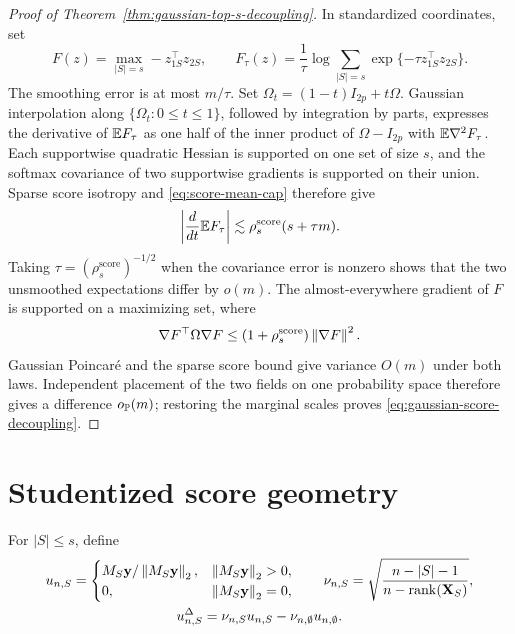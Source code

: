 \begin{proof}[Proof of
Theorem~\ref{thm:gaussian-top-s-decoupling}]
In standardized coordinates, set
\[
 F(z)=\max_{|S|=s}-z_{1S}^\top z_{2S},
 \qquad
 F_\tau(z)=\frac1\tau
 \log\sum_{|S|=s}\exp\{-\tau z_{1S}^\top z_{2S}\}.
\]
The smoothing error is at most $m/\tau$.  Set
$\Omega_t=(1-t)I_{2p}+t\Omega$.  Gaussian interpolation along
$\{\Omega_t:0\le t\le1\}$, followed by integration by parts,
expresses the derivative of $\mathbb E F_\tau$ as one half of the inner product
of $\Omega-I_{2p}$ with $\mathbb E\nabla^2F_\tau$.  Each supportwise quadratic
Hessian is supported on one set of size $s$, and the softmax covariance
of two supportwise gradients is supported on their union.  Sparse score
isotropy and \eqref{eq:score-mean-cap} therefore give
\[
 \left|\frac{d}{dt}\mathbb E F_\tau\right|
 \lesssim\rho_s^{\mathrm{score}}(s+\tau m).
\]
Taking $\tau=(\rho_s^{\mathrm{score}})^{-1/2}$ when the covariance error
is nonzero shows that the two unsmoothed expectations differ by $o(m)$.
The almost-everywhere gradient of $F$ is supported on a maximizing set,
where
\[
 \nabla F^\top\Omega\nabla F
 \le(1+\rho_s^{\mathrm{score}})\left\lVert \nabla F\right\rVert^2.
\]
Gaussian Poincar\'e and the sparse score bound give variance $O(m)$
under both laws.  Independent placement of the two fields on one
probability space therefore gives a difference
$o_{\mathbb P}(m)$; restoring the marginal scales proves
\eqref{eq:gaussian-score-decoupling}.
\end{proof}

\section{Studentized score geometry}\label{app:studentized-geometry}

For $|S|\le s$, define
\begin{equation}\label{eq:studentized-directions}
\begin{gathered}
        u_{n,S}=\begin{cases}
        M_S\mathbf y/\left\lVert M_S\mathbf y\right\rVert_2,
        &\left\lVert M_S\mathbf y\right\rVert_2>0,\\
        0,&\left\lVert M_S\mathbf y\right\rVert_2=0,
        \end{cases}
        \qquad
        \nu_{n,S}
        =\sqrt{\frac{n-|S|-1}{n-\operatorname{rank}(\mathbf X_S)}},\\
        u_{n,S}^{\Delta}
        =\nu_{n,S}u_{n,S}
        -\nu_{n,\emptyset}u_{n,\emptyset}.
\end{gathered}
\end{equation}

